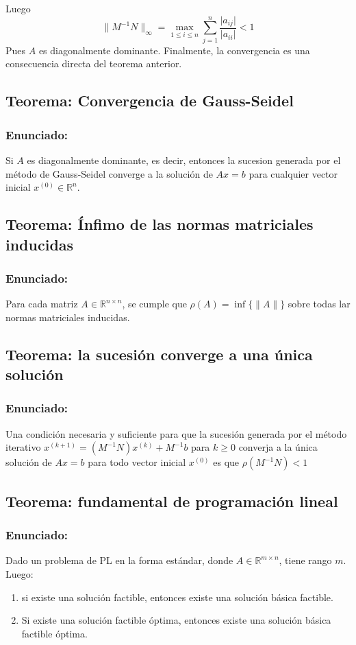 \documentclass[a4paper,12pt]{article}
\begin{document}
Luego 
\[
\parallel M^{-1}N\parallel_\infty = \max_{1\leq i \leq n} \sum_{j=1}^{n} \frac{\lvert a_{ij}\rvert}{\lvert a_{ii}\rvert}<1 
\]
Pues $A$ es diagonalmente dominante. Finalmente, la convergencia es una consecuencia directa del teorema anterior.

\subsection{Teorema: Convergencia de Gauss-Seidel}
\subsubsection{Enunciado:}

Si $A$ es diagonalmente dominante, es decir, entonces la sucesion generada por el método de Gauss-Seidel converge a la solución de $Ax=b$ para cualquier vector inicial $x^{(0)} \in \mathbb{R}^n$.

\subsection{Teorema: Ínfimo de las normas matriciales inducidas}
\subsubsection{Enunciado:}
Para cada matriz $A \in \mathbb{R}^{n\times n}$, se cumple que $\rho(A) = \inf \{\parallel A\parallel \}$ sobre todas lar normas matriciales inducidas. 

\subsection{Teorema: la sucesión converge a una única solución}
\subsubsection{Enunciado:}
Una condición necesaria y suficiente para que la sucesión generada por el método iterativo $x^{(k+1)}=(M^{-1}N)x^{(k)}+M^{-1}b$  para $k\geq 0$ converja a la única solución de $Ax=b$ para todo vector inicial $x^{(0)}$ es que $\rho(M^{-1}N)<1$

\subsection{Teorema: fundamental de programación lineal}
\subsubsection{Enunciado:}
Dado un problema de PL en la forma estándar, donde $A \in \mathbb{R}^{m\times n}$, tiene rango $m$. Luego:
\begin{enumerate}
    \item si existe una solución factible, entonces existe una solución básica factible.
    \item Si existe una solución factible óptima, entonces existe una solución básica factible óptima.
\end{enumerate}  
\end{document}
